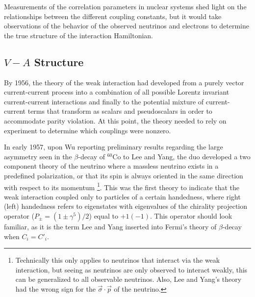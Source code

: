 Measurements of the correlation parameters in nuclear systems shed light on the
relationships between the different coupling constants, but it would take observations
of the behavior of the observed neutrinos and electrons to determine the true structure
of the interaction Hamiltonian.

\subsection{$V-A$ Structure} \label{ssec:VminusA}

By 1956, the theory of the weak interaction had developed from a purely vector current-current
process into
a combination of all possible Lorentz invariant current-current interactions and finally to the potential mixture
of current-current terms that transform as scalars and pseudoscalars in order to accommodate
parity violation. At this point, the theory needed to rely on experiment to determine
which couplings were nonzero.

In early 1957, upon Wu reporting preliminary results regarding the large asymmetry seen in the $\beta$-decay
of $^{60}\mathrm{Co}$ to Lee and Yang, the duo developed a two component theory
of the neutrino where a massless neutrino exists in a predefined polarization, or that
its spin is always oriented in the same direction with respect to its momentum \cite{lee1957}
\footnote{Technically this only applies to neutrinos that interact via
  the weak interaction, but seeing as neutrinos are only
  observed to interact weakly, this can be generalized to all observable neutrinos. Also, Lee and
  Yang's theory had the wrong sign for the $\vec{\sigma} \cdot \vec{p}$ of the neutrino.}.
This was the first theory to indicate that the weak interaction coupled only to particles
of a certain handedness, where right (left) handedness refers to eigenstates with eigenvalues of the
chirality projection operator ($P_{\pm} = (1\pm \gamma^5)/2$) equal to $+1\mathrm{ }(-1)$. This operator
should look familiar, as it is the term Lee and Yang inserted into Fermi's theory of $\beta$-decay
when $C_i=C'_i$. 

